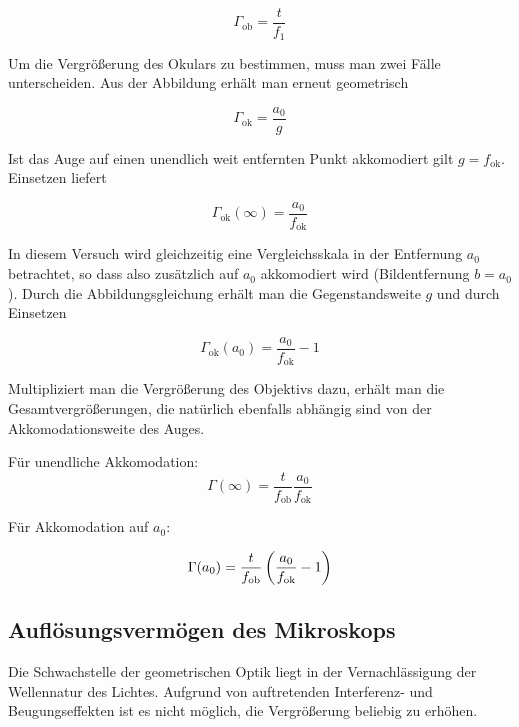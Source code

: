 \documentclass[a4paper,german,12pt,smallheadings]{scrartcl}
\begin{document}
\begin{equation}
  \Gamma_\text{ob} = \frac{t}{f_1}
\end{equation}


Um die Vergrößerung des Okulars zu bestimmen, muss man zwei Fälle
unterscheiden. Aus der Abbildung erhält man erneut geometrisch

\begin{equation}
  \Gamma_\text{ok} = \frac{a_0}{g}
\end{equation}

Ist das Auge auf einen unendlich weit entfernten Punkt akkomodiert gilt $g =
f_\text{ok}$. Einsetzen liefert

\begin{equation}
  \Gamma_\text{ok}(\infty) = \frac{a_0}{f_\text{ok}}
\end{equation}

In diesem Versuch wird gleichzeitig eine Vergleichsskala in der Entfernung
$a_0$ betrachtet, so dass also zusätzlich auf $a_0$ akkomodiert wird
(Bildentfernung $b = a_0$). Durch die Abbildungsgleichung erhält man die
Gegenstandsweite $g$ und durch Einsetzen

\begin{equation}
  \Gamma_\text{ok}(a_0) = \frac{a_0}{f_\text{ok}} - 1
\end{equation}

Multipliziert man die Vergrößerung des Objektivs dazu, erhält man die
Gesamtvergrößerungen, die natürlich ebenfalls abhängig sind von der
Akkomodationsweite des Auges.

Für unendliche Akkomodation:
\begin{equation}
  \Gamma(\infty) = \frac{t}{f_\text{ob}} \frac{a_0}{f_\text{ok}}
  \label{eq:vergr_inf}
\end{equation}

Für Akkomodation auf $a_0$:

\begin{equation}
  \Gamma(a_0) = \frac{t}{f_\text{ob}} \del{\frac{a_0}{f_\text{ok}} - 1}
  \label{eq:vergr}
\end{equation}

\subsection{Auflösungsvermögen des Mikroskops}

Die Schwachstelle der geometrischen Optik liegt in der Vernachlässigung der
Wellennatur des Lichtes. Aufgrund von auftretenden Interferenz- und
Beugungseffekten ist es nicht möglich, die Vergrößerung beliebig zu erhöhen.
\end{document}
